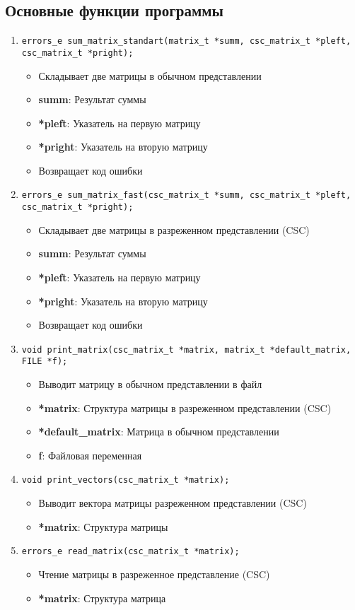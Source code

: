 \subsection{Основные функции программы}
\begin{enumerate}
	\item \texttt{errors\_e sum\_matrix\_standart(matrix\_t *summ, csc\_matrix\_t *pleft, csc\_matrix\_t *pright);}
	\begin{itemize}
		\item Складывает две матрицы в обычном представлении
		\item \textbf{summ}: Результат суммы
		\item \textbf{*pleft}: Указатель на первую матрицу
		\item \textbf{*pright}: Указатель на вторую матрицу
		\item Возвращает код ошибки
	\end{itemize}
	\item \texttt{errors\_e sum\_matrix\_fast(csc\_matrix\_t *summ, csc\_matrix\_t *pleft, csc\_matrix\_t *pright);}
	\begin{itemize}
		\item Складывает две матрицы в разреженном представлении (CSC)
		\item \textbf{summ}: Результат суммы
		\item \textbf{*pleft}: Указатель на первую матрицу
		\item \textbf{*pright}: Указатель на вторую матрицу
		\item Возвращает код ошибки
	\end{itemize}
	\item \texttt{void print\_matrix(csc\_matrix\_t *matrix, matrix\_t *default\_matrix, FILE *f);}
	\begin{itemize}
		\item Выводит матрицу в обычном представлении в файл
		\item \textbf{*matrix}: Структура матрицы в разреженном представлении (CSC)
		\item \textbf{*default\_matrix}: Матрица в обычном представлении 
		\item \textbf{f}: Файловая переменная
	\end{itemize}
	\item \texttt{void print\_vectors(csc\_matrix\_t *matrix);}
	\begin{itemize}
		\item Выводит вектора матрицы разреженном представлении (CSC)
		\item \textbf{*matrix}: Структура матрицы
	\end{itemize}
	\item \texttt{errors\_e read\_matrix(csc\_matrix\_t *matrix);}
	\begin{itemize}
		\item Чтение матрицы в разреженное представление (CSC)
		\item \textbf{*matrix}: Структура матрица
	\end{itemize}
\end{enumerate}
